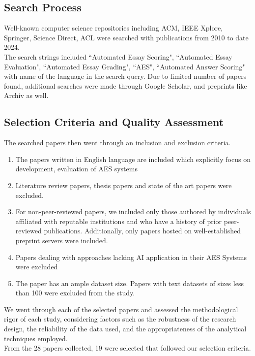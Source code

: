 \documentclass{article}
\begin{document}
\subsection{Search Process}
Well-known computer science repositories including ACM, IEEE Xplore, Springer, Science Direct, ACL were searched with publications from 2010 to date 2024. \\
The search strings included ``Automated Essay Scoring", ``Automated Essay Evaluation", ``Automated Essay Grading", ``AES", ``Automated Answer Scoring"  with name of the language in the search query. Due to limited number of papers found, additional searches were made through Google Scholar, and preprints like Archiv as well.
\\
\subsection{Selection Criteria and Quality Assessment}
The searched papers then went through an inclusion and exclusion criteria.
\begin{enumerate}[label=\textbf{Criteria \arabic*}, leftmargin=2cm]
    \item The papers written in English language are included which explicitly focus on development, evaluation of AES systems
    \item Literature review papers, thesis papers and state of the art papers were excluded.
    \item For non-peer-reviewed papers, we included only those authored by individuals affiliated with reputable institutions and who have a history of prior peer-reviewed publications. Additionally, only papers hosted on well-established preprint servers were included.
    \item Papers dealing with approaches lacking AI application in their AES Systems were excluded
    \item The paper has an ample dataset size. Papers with text datasets of sizes less than 100 were excluded from the study.
\end{enumerate}
We went through each of the selected papers and assessed the methodological rigor of each study, considering factors such as the robustness of the research design, the reliability of the data used, and the appropriateness of the analytical techniques employed. \\
From the 28 papers collected, 19 were selected that followed our selection criteria.
\renewcommand{\arraystretch}{1.5}
\end{document}
